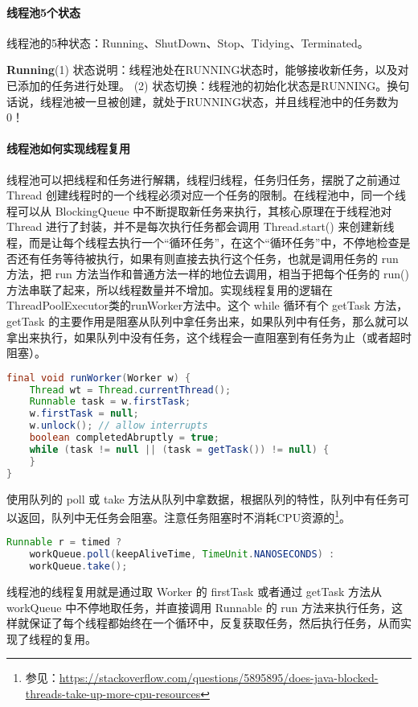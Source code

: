 \documentclass[../../../interview-questions.tex]{subfiles}
\begin{document}
\paragraph{线程池5个状态}

线程池的5种状态：Running、ShutDown、Stop、Tidying、Terminated。

\textbf{Running}(1) 状态说明：线程池处在RUNNING状态时，能够接收新任务，以及对已添加的任务进行处理。
(2) 状态切换：线程池的初始化状态是RUNNING。换句话说，线程池被一旦被创建，就处于RUNNING状态，并且线程池中的任务数为0！

\paragraph{线程池如何实现线程复用}

线程池可以把线程和任务进行解耦，线程归线程，任务归任务，摆脱了之前通过 Thread 创建线程时的一个线程必须对应一个任务的限制。在线程池中，同一个线程可以从 BlockingQueue 中不断提取新任务来执行，其核心原理在于线程池对 Thread 进行了封装，并不是每次执行任务都会调用 Thread.start() 来创建新线程，而是让每个线程去执行一个“循环任务”，在这个“循环任务”中，不停地检查是否还有任务等待被执行，如果有则直接去执行这个任务，也就是调用任务的 run 方法，把 run 方法当作和普通方法一样的地位去调用，相当于把每个任务的 run() 方法串联了起来，所以线程数量并不增加。实现线程复用的逻辑在ThreadPoolExecutor类的runWorker方法中。这个 while 循环有个 getTask 方法，getTask 的主要作用是阻塞从队列中拿任务出来，如果队列中有任务，那么就可以拿出来执行，如果队列中没有任务，这个线程会一直阻塞到有任务为止（或者超时阻塞）。

\begin{lstlisting}[language=Java]
final void runWorker(Worker w) {
    Thread wt = Thread.currentThread();
    Runnable task = w.firstTask;
    w.firstTask = null;
    w.unlock(); // allow interrupts
    boolean completedAbruptly = true;
    while (task != null || (task = getTask()) != null) {
    }
}
\end{lstlisting}

使用队列的 poll 或 take 方法从队列中拿数据，根据队列的特性，队列中有任务可以返回，队列中无任务会阻塞。注意任务阻塞时不消耗CPU资源的\footnote{参见：\url{https://stackoverflow.com/questions/5895895/does-java-blocked-threads-take-up-more-cpu-resources}}。

\begin{lstlisting}[language=Java]
Runnable r = timed ?
    workQueue.poll(keepAliveTime, TimeUnit.NANOSECONDS) :
    workQueue.take();
\end{lstlisting}
    

线程池的线程复用就是通过取 Worker 的 firstTask 或者通过 getTask 方法从 workQueue 中不停地取任务，并直接调用 Runnable 的 run 方法来执行任务，这样就保证了每个线程都始终在一个循环中，反复获取任务，然后执行任务，从而实现了线程的复用。
\end{document}
